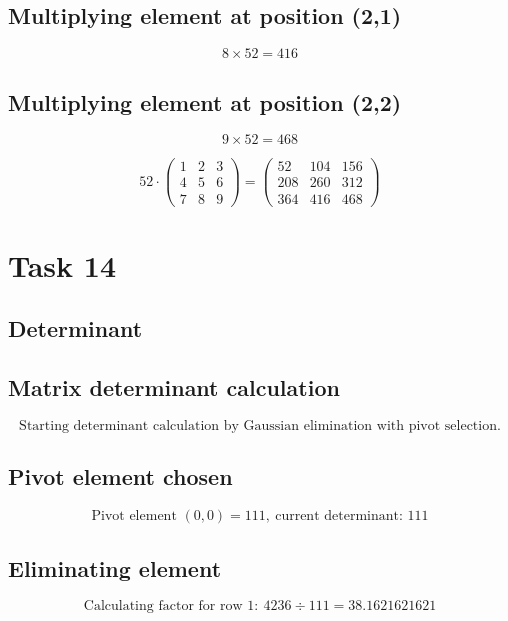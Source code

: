 \documentclass{article}
\begin{document}
\subsection*{ \vspace{1em} Multiplying element at position (2,1)}
\[
8 \times 52 = 416
\]
\subsection*{ \vspace{1em} Multiplying element at position (2,2)}
\[
9 \times 52 = 468
\]
\medskip

\[
52 \cdot \begin{pmatrix}1 & 2 & 3 \\ 4 & 5 & 6 \\ 7 & 8 & 9\end{pmatrix} = \begin{pmatrix}52 & 104 & 156 \\ 208 & 260 & 312 \\ 364 & 416 & 468\end{pmatrix}
\]
\bigskip

\hrulefill
\bigskip

\section*{Task 14}

\subsection*{Determinant}
\subsection*{ \vspace{1em} Matrix determinant calculation}
\[
\text{Starting determinant calculation by Gaussian elimination with pivot selection.}
\]
\subsection*{ \vspace{1em} Pivot element chosen}
\[
\text{Pivot element } ( 0,0 ) = 111,\ \text{current determinant: } 111
\]
\subsection*{ \vspace{1em} Eliminating element}
\[
\text{Calculating factor for row } 1:\ 4236 \div 111 = 38.1621621621
\]
\end{document}

